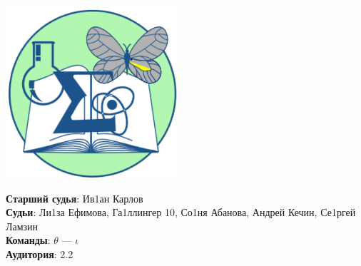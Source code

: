 \documentclass[12pt]{article}
\begin{document}
\begin{minipage}{.30\textwidth}
\begin{center}
\includegraphics[width=0.48\textwidth]{klshlogo.pdf}
\end{center}
\end{minipage}
\begin{minipage}{.65\textwidth}
\begin{flushleft}
{\bf Старший судья}: Ив1ан Карлов\\ 
{\bf Судьи}: Ли1за Ефимова, Га1ллингер 10, Со1ня Абанова, Андрей Кечин, Се1ргей Ламзин\\ 
{\bf Команды}: $\theta$ --- $\iota$\\ 
{\bf Аудитория}: 2.2\\ 
\end{flushleft}
\end{minipage}
\end{document}
